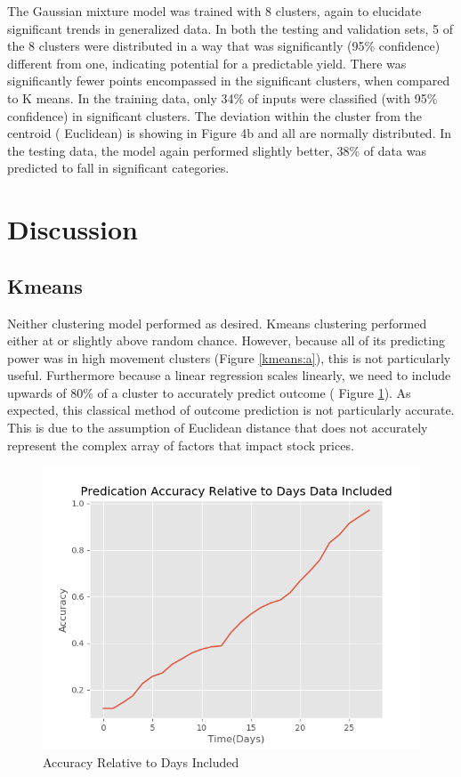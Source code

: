 \documentclass{article}
\begin{document}
	The Gaussian mixture model was trained with 8 clusters, again to elucidate significant trends in generalized data. In both the testing and validation sets, 5 of the 8 clusters were distributed in a way that was significantly (95\% confidence) different from one, indicating potential for a predictable yield. There was significantly fewer points encompassed in the significant clusters, when compared to K means. In the training data, only 34\% of inputs were classified (with 95\% confidence) in significant clusters. The deviation within the cluster from the centroid ( Euclidean) is showing in Figure 4b and all are normally distributed.  In the testing data, the model again performed slightly better, 38\% of data was predicted to fall in significant categories. 
\section{Discussion}
\subsection{Kmeans}
Neither clustering model performed as desired. Kmeans clustering performed either at or slightly above random chance. However, because all of its predicting power was in high movement clusters (Figure \ref{kmeans:a}), this is not particularly useful. Furthermore because a linear regression scales linearly, we need to include upwards of 80\% of a cluster to accurately predict outcome ( Figure \ref{fig:accur}). As expected, this classical method of outcome prediction is not particularly accurate. This is due to the assumption of Euclidean distance that does not accurately represent the complex array of factors that impact stock prices.
\begin{figure}[h]
    \centering
    \includegraphics[width = .5\linewidth]{Accuracy.png}
    \caption{Accuracy Relative to Days Included}
    \label{fig:accur}
\end{figure}
\end{document}
